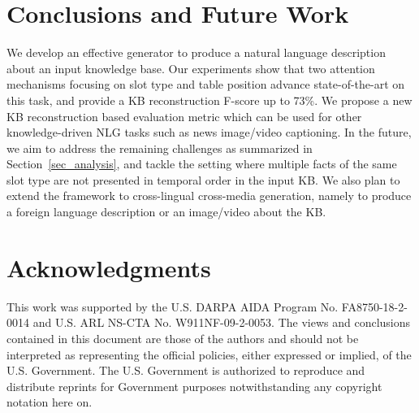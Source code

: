 \documentclass[11pt,a4paper]{article}
\begin{document}
 \section{Conclusions and Future Work}

We develop an effective generator to produce a natural language description about an input knowledge base. Our experiments show that two attention mechanisms focusing on slot type and table position advance state-of-the-art on this task, and provide a KB reconstruction F-score up to 73\%. We propose a new KB reconstruction based evaluation metric which can be used for other knowledge-driven NLG tasks such as news image/video captioning. In the future, we aim to address the remaining challenges as summarized in Section~\ref{sec_analysis}, and tackle the setting where multiple facts of the same slot type are not presented in temporal order in the input KB. 
We also plan to extend the framework to cross-lingual cross-media generation, namely to produce a foreign language description or an image/video about the KB.  














%
 
\section*{Acknowledgments}
This work was supported by the U.S. DARPA AIDA Program No. FA8750-18-2-0014 and U.S. ARL NS-CTA No. W911NF-09-2-0053. The views and conclusions contained in this document are those of the authors and should not be interpreted as representing the official policies, either expressed or implied, of the U.S. Government. The U.S. Government is authorized to reproduce and distribute reprints for Government purposes notwithstanding any copyright notation here on.




\end{document}
